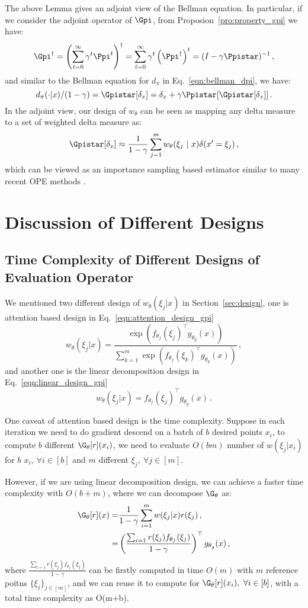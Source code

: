 The above Lemma gives an adjoint view of the Bellman equation.
In particular, if we consider the adjoint operator of $\Gpi$, from Proposion~\ref{pro:property_gpi} we have:
$$
    \Gpi^\dag = \left(\sum_{t=0}^\infty \gamma^t \Ppi^t\right)^\dag 
    =\sum_{t=0}^\infty \gamma^t  \left(\Ppi^\dag\right)^t = (I-\gamma \Ppistar)^{-1}\,,
$$
and similar to the Bellman equation for $d_\pi$ in Eq.~\eqref{eqn:bellman_dpi}, we have:
$$
   d_\pi(\cdot|x)/(1-\gamma) = \Gpistar[\delta_x] = \delta_x + \gamma \Ppistar[\Gpistar[\delta_x]]\,.
$$
In the adjoint view, our design of $w_\theta$ can be seen as mapping any delta measure to a set of weighted delta measure as:
$$
\Gpistar[\delta_x] \approx \frac{1}{1-\gamma}\sum_{j=1}^m   w_\theta(\xi_j~|~x) \delta(x' = {\xi_j})\,,
$$
which can be viewed as an importance sampling based estimator similar to many recent OPE methods \citep{liu2018breaking}.


\clearpage
\section{Discussion of Different Designs}
\label{sec:discuss_design}

\subsection{Time Complexity of Different Designs of Evaluation Operator}
We mentioned two different design of $w_\theta(\xi_j|x)$ in Section~\ref{sec:design}, one is attention based design in Eq.~\eqref{eqn:attention_design_gpi}
$$
    w_\theta({\xi_j}|x) = \frac{\exp(f_{\theta_f}(\xi_j)^\top g_{\theta_g}(x))}{\sum_{k=1}^m \exp(f_{\theta_f}(\xi_k)^\top g_{\theta_g}(x))}\,,
$$
and another one is the linear decomposition design in Eq.~\eqref{eqn:linear_design_gpi}
$$
    w_\theta({\xi_j}|x) = f_{\theta_f}(\xi_j)^\top g_{\theta_g}(x)\,.
$$

One caveat of attention based design is the time complexity.
Suppose in each iteration we need to do gradient descend on a batch of $b$ desired points $x_i$, to compute $b$ different $\G_\theta[r](x_i)$, we need to evaluate $O(bm)$ number of $w(\xi_j|x_i)$ for $b$ $x_i,~\forall i\in [b]$ and $m$ different $\xi_j,~\forall j\in [m]$.

However, if we are using linear decomposition design, we can achieve a faster time complexity with $O(b+m)$, where we can decompose $\G_\theta$ as:
\begin{align}\label{eqn:linear_decompose_gpi}
    \G_\theta[r](x) =& \frac{1}{1-\gamma}\sum_{i=1}^m w(\xi_j|x) r(\xi_j)\,,\notag \\
    =& \left( \frac{\sum_{i=1} r(\xi_j) f_{\theta_f}(\xi_j)}{1-\gamma}\right)^\top g_{\theta_g}(x)\,,
\end{align}
where $\frac{\sum_{i=1} r(\xi_j) f_{\theta_f}(\xi_j)}{1-\gamma}$ can be firstly computed in time $O(m)$ with $m$ reference poitns $\{\xi_j\}_{j\in [m]}$, and we can reuse it to compute for $\G_\theta[r](x_i),~\forall i\in [b]$, with a total time complexity as O(m+b).



